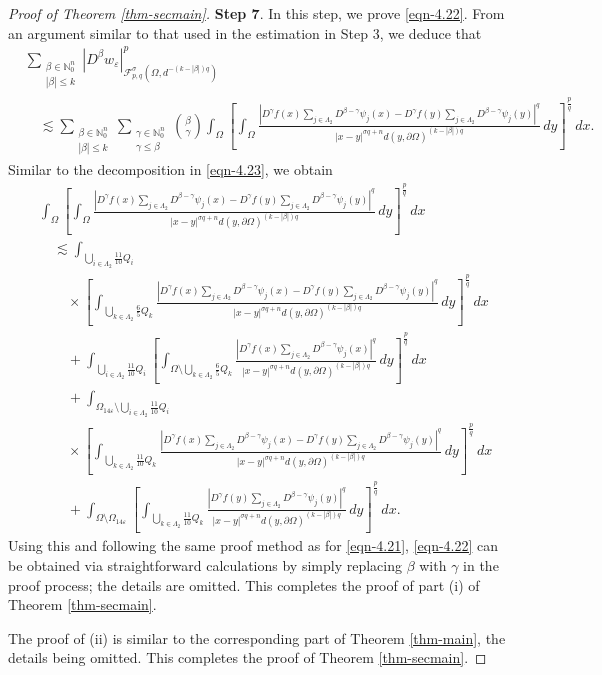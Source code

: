 \documentclass[11pt,twoside]{article}
\def\nn{{\mathbb N}}
\def\nno{\nn_0}
\def\cf{{\mathcal F}}
\def\Qi{\frac{11}{10}Q_i}
\def\Qkk{\frac{6}{5}Q_k}
\def\Qk{\frac{11}{10}Q_k}
\def\bz{\beta}
\def\blz{\Lambda}
\def\boz{{\Omega}}
\def\sz{\sigma}
\def\pa{\partial}                %
\def\we{w_{\varepsilon}}
\def\huae{\varepsilon}
\def\bozfour{\Omega_{14\huae}}
\theoremstyle{mylem}
\theoremstyle{definition}
\numberwithin{equation}{section}
\begin{document}
\begin{proof}[Proof of Theorem \ref{thm-secmain}]
{\bf Step 7}. In this step, we prove \eqref{eqn-4.22}. From an argument similar to that used in the estimation in Step 3, we deduce that
\begin{align*}
& \sum_{\substack{\bz\in\nno^n \\ | \bz| \leq k}} \left|D^{\bz}\we\right|_{\cf_{p,q}^{\sz}(\boz,d^{-(k-|\bz|)q})}^p \\ &\quad\lesssim \sum_{\substack{\bz\in\nno^n \\|\bz| \leq k}}  \sum_{\substack{\gamma\in\nno^n \\ \gamma \leq \bz}} \binom{\bz}{\gamma} \int_{\boz} \left[\int_{\boz} \frac{| D^\gamma f(x) \sum_{j\in\Lambda_2}D^{\bz - \gamma} \psi_j(x) - D^\gamma f(y) \sum_{j\in\Lambda_2}D^{\bz - \gamma} \psi_j(y)|^q}{|x - y|^{\sz q + n}d(y,\pa\boz)^{(k-|\bz|)q}}\,dy \right]^{\frac{p}{q}}\,dx.
\end{align*}
Similar to the decomposition in \eqref{eqn-4.23}, we obtain
\begin{align*}
&\int_{\boz} \left[ \int_{\boz} \frac{| D^\gamma f(x) \sum_{j\in\Lambda_2}D^{\bz - \gamma} \psi_j(x) - D^\gamma f(y) \sum_{j\in\Lambda_2}D^{\bz - \gamma} \psi_j(y)|^q}{|x - y|^{\sz q + n}d(y,\pa\boz)^{(k-|\bz|)q}}\,dy \right]^{\frac{p}{q}}\,dx \\
&\quad\lesssim \int_{\bigcup_{i \in \blz_2} \Qi} \\
&\qquad\times\left[ \int_{\bigcup_{k \in \blz_2} \Qkk} \frac{| D^\gamma f(x) \sum_{j\in\Lambda_2}D^{\bz - \gamma} \psi_j(x) - D^\gamma f(y)\sum_{j\in\Lambda_2} D^{\bz - \gamma} \psi_j(y)|^q}{|x - y|^{\sz q + n}d(y,\pa\boz)^{ (k-|\bz|)q}}\,dy \right]^{\frac{p}{q}}\,dx \\
&\qquad+ \int_{\bigcup_{i \in \blz_2} \Qi} \left[ \int_{\boz \setminus \bigcup_{k \in \blz_2} \Qkk} \frac{| D^\gamma f(x) \sum_{j\in\Lambda_2}D^{\bz - \gamma} \psi_j(x)|^q}{|x - y|^{\sz q + n}d(y,\pa\boz)^{(k-|\bz|)q}}\,dy \right]^{\frac{p}{q}}\,dx \\
&\qquad+\int_{\bozfour \setminus \bigcup_{i \in \blz_2} \Qi} \\
&\qquad\times\left[ \int_{\bigcup_{k \in \blz_2} \Qk} \frac{| D^\gamma f(x) \sum_{j\in\Lambda_2}D^{\bz - \gamma} \psi_j(x) - D^\gamma f(y) \sum_{j\in\Lambda_2}D^{\bz - \gamma} \psi_j(y)|^q}{|x - y|^{\sz q + n}d(y,\pa\boz)^{(k-|\bz|)q}}\,dy \right]^{\frac{p}{q}}\,dx \\
&\qquad+ \int_{\boz \setminus \bozfour} \left[ \int_{\bigcup_{k \in \blz_2} \Qk} \frac{| D^\gamma f(y) \sum_{j\in\Lambda_2}D^{\bz - \gamma} \psi_j(y)|^q}{|x - y|^{\sz q + n}d(y,\pa\boz)^{(k-|\bz|)q}}\,dy \right]^{\frac{p}{q}}\,dx. 
\end{align*}
Using this and following the same proof method as for \eqref{eqn-4.21}, \eqref{eqn-4.22} can be obtained via straightforward calculations by simply replacing $\bz$ with $\gamma$ in the proof process; the details are omitted. This completes the proof of part (i) of Theorem \ref{thm-secmain}.

The proof of  (ii) is similar to the corresponding part 
of Theorem \ref{thm-main}, the details being omitted.
This completes the proof of Theorem \ref{thm-secmain}.
\end{proof}
\end{document}

